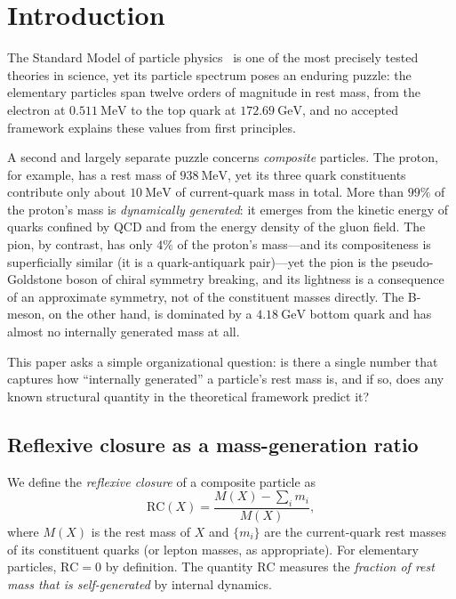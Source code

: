 \documentclass[12pt,a4paper]{article}
\newcommand{\RC}{\ensuremath{\mathrm{RC}}}
\begin{document}
\section{Introduction}
\label{sec:intro}

The Standard Model of particle physics~\cite{Glashow1961,Weinberg1967,Salam1968}
is one of the most precisely tested theories in science, yet its particle
spectrum poses an enduring puzzle: the elementary particles span twelve
orders of magnitude in rest mass, from the electron at $\SI{0.511}{\mega\eV}$
to the top quark at $\SI{172.69}{\giga\eV}$, and no accepted framework
explains these values from first principles.

A second and largely separate puzzle concerns \emph{composite} particles.
The proton, for example, has a rest mass of $\SI{938}{\mega\eV}$, yet its
three quark constituents contribute only about $\SI{10}{\mega\eV}$ of
current-quark mass in total.
More than $99\%$ of the proton's mass is \emph{dynamically generated}:
it emerges from the kinetic energy of quarks confined by QCD and from the
energy density of the gluon field.
The pion, by contrast, has only $4\%$ of the proton's mass---and its
compositeness is superficially similar (it is a quark-antiquark pair)---yet
the pion is the pseudo-Goldstone boson of chiral symmetry breaking, and its
lightness is a consequence of an approximate symmetry, not of the constituent
masses directly.
The B-meson, on the other hand, is dominated by a $\SI{4.18}{\giga\eV}$
bottom quark and has almost no internally generated mass at all.

This paper asks a simple organizational question: is there a single number that
captures how ``internally generated'' a particle's rest mass is, and if so,
does any known structural quantity in the theoretical framework predict it?

\subsection{Reflexive closure as a mass-generation ratio}

We define the \emph{reflexive closure} of a composite particle as
\begin{equation}
  \RC(X) = \frac{M(X) - \sum_{i} m_i}{M(X)},
  \label{eq:RC}
\end{equation}
where $M(X)$ is the rest mass of $X$ and $\{m_i\}$ are the current-quark
rest masses of its constituent quarks (or lepton masses, as appropriate).
For elementary particles, $\RC = 0$ by definition.
The quantity $\RC$ measures the \emph{fraction of rest mass that is
self-generated} by internal dynamics.
\end{document}
